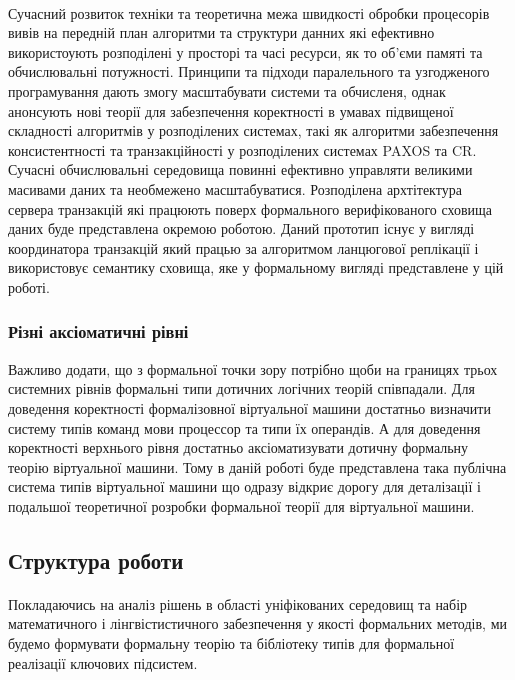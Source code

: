 \documentclass[11pt,oneside]{article}
\begin{document}
   \paragraph{}
   Сучасний розвиток техніки та теоретична межа швидкості обробки процесорів вивів на передній план алгоритми та структури
   данних які ефективно використоують розподілені у просторі та часі ресурси, як то об’єми памяті та обчислювальні потужності.
   Принципи та підходи паралельного та узгодженого програмування дають змогу масштабувати системи та обчисленя, однак
   анонсують нові теорії для забезпечення коректності в умавах підвищеної складності алгоритмів у розподілених системах,
   такі як алгоритми забезпечення консистентності та транзакційності у розподілених системах PAXOS\cite{lampax} та CR\cite{renesse1}.
   Сучасні обчислювальні середовища повинні ефективно управляти великими масивами
   даних та необмежено масштабуватися. Розподілена архтітектура сервера транзакцій
   які працюють поверх формального верифікованого сховища даних буде представлена
   окремою роботою. Даний прототип існує у вигляді координатора транзакцій який працью
   за алгоритмом ланцюгової реплікації і використовує семантику сховища, яке
   у формальному вигляді представлене у цій роботі.

\subsubsection{Різні аксіоматичні рівні}

   Важливо додати, що з формальної точки зору потрібно щоби на границях
   трьох системних рівнів формальні типи дотичних логічних теорій співпадали.
   Для доведення коректності формалізовної віртуальної машини достатньо
   визначити систему типів команд мови процессор та типи їх операндів. А для
   доведення коректності верхнього рівня достатньо аксіоматизувати дотичну
   формальну теорію віртуальної машини. Тому в даній роботі буде представлена
   така публічна система типів віртуальної машини що одразу відкриє дорогу
   для деталізації і подальшої теоретичної розробки формальної теорії для віртуальної машини.

\newpage

\subsection{Структура роботи}
\vspace{0.5cm}

   \paragraph{}
   Покладаючись на аналіз рішень в області уніфікованих середовищ та
   набір математичного і лінгвістистичного забезпечення у якості формальних методів,
   ми будемо формувати формальну теорію та бібліотеку типів для формальної
   реалізації ключових підсистем.
\end{document}
